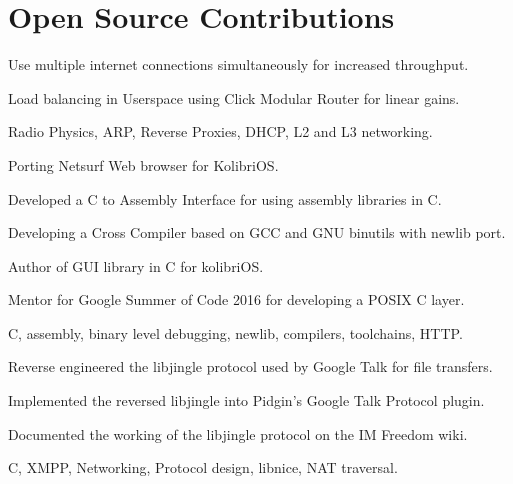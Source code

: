 \documentclass[letterpaper]{deedy-resume} %
\begin{document}
\begin{minipage}[t]{0.66\textwidth}
\section{Open Source Contributions}
\begin{tightitemize}
\item Use multiple internet connections simultaneously for increased throughput.
\item Load balancing in Userspace using Click Modular Router for linear gains.
\item Radio Physics, ARP, Reverse Proxies, DHCP, L2 and L3 networking.
\end{tightitemize}
\sectionspace %
\begin{tightitemize}
\item Porting Netsurf Web browser for KolibriOS.
\item Developed a C to Assembly Interface for using assembly libraries in C.
\item Developing a Cross Compiler based on GCC and GNU binutils with newlib port.
\item Author of GUI library in C for kolibriOS.
\item Mentor for Google Summer of Code 2016 for developing a POSIX C layer.
\item C, assembly, binary level debugging, newlib, compilers, toolchains, HTTP.
\end{tightitemize}
\sectionspace %
\begin{tightitemize}
\item Reverse engineered the libjingle protocol used by Google Talk for file transfers.
\item Implemented the reversed libjingle into Pidgin's Google Talk Protocol plugin.
\item Documented the working of the libjingle protocol on the IM Freedom wiki.
\item C, XMPP, Networking, Protocol design, libnice, NAT traversal.
\end{tightitemize}
\sectionspace %

\end{minipage}
\end{document}
